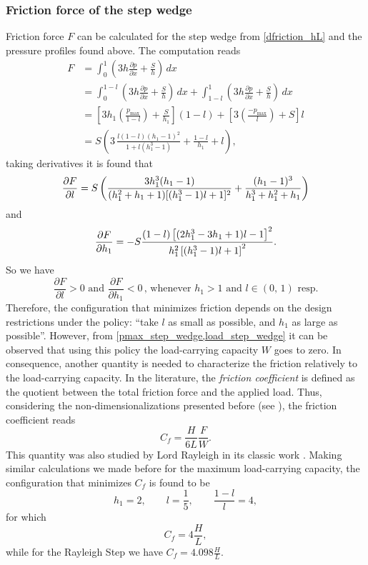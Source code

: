 \subsubsection*{Friction force of the step wedge}
\label{sec:friction_step_wedge}
Friction force $F$ can be calculated for the step wedge from \eqref{dfriction_hL} and the pressure profiles found above. The computation reads
\begin{align}
F&=\int_0^1 \left(3h\frac{\partial p}{\partial x} +\frac{S}{h}\right)\,dx\nonumber\\
&=\int_0^{1-l} \left(3h\frac{\partial p}{\partial x} +\frac{S}{h}\right)\,dx+\int_{1-l}^1 \left(3h\frac{\partial p}{\partial x} +\frac{S}{h}\right)\,dx\nonumber\\
&=\left[3h_1\left(\frac{p_\text{max}}{1-l}\right)+\frac{S}{h_1}\right](1-l)+\left[3\left(\frac{-p_\text{max}}{l}\right)+S\right] l\nonumber\\
&=S\left(3\,\frac{l(1-l)(h_1-1)^2}{1+l(h_1^3-1)}+\frac{1-l}{h_1}+l\right),\label{eq:friction_step_wedge}
\end{align}
taking derivatives it is found that
$$\frac{\partial F}{\partial l}=S\left(\frac{3h_1^3(h_1-1)}{(h_1^2+h_1+1)[(h_1^3-1)l+1]^2}+\frac{(h_1-1)^3}{h_1^3+h_1^2+h_1}\right)$$ and
$$\frac{\partial F}{\partial h_1}=-S\frac{(1-l)\left[(2h_1^3-3h_1+1)l-1\right]^2}{h_1^2\left[(h_1^3-1)l+1\right]^2}.$$
So we have
 $$\frac{\partial F}{\partial l}>0\text{ and }\frac{\partial F}{\partial h_1}<0\,\text{, whenever } h_1>1\text{ and }l\in (0,\,1)\text{ resp}.$$
Therefore, the configuration that minimizes friction depends on the design restrictions under the policy: ``take $l$ as small as possible, and $h_1$ as large as possible''. However, from \eqref{pmax_step_wedge,load_step_wedge} it can be observed that using this policy the load-carrying capacity $W$ goes to zero. In consequence, another quantity is needed to characterize the friction relatively to the load-carrying capacity. In the literature, the \emph{friction coefficient} is defined as the quotient between the total friction force and the applied load. Thus, considering the non-dimensionalizations presented before (see ), the friction coefficient reads 
\begin{equation}
C_f=\frac{H}{6L}\frac{F}{W}.\label{eq:friction_coefficient}
\end{equation}
This quantity was also studied by Lord Rayleigh in its classic work \cite{rayleigh1918}. Making similar calculations we made before for the maximum load-carrying capacity, the configuration that minimizes $C_f$ is found to be
\begin{equation*}
h_1=2,\qquad l=\frac{1}{5}, \qquad \frac{1-l}{l}=4,
\end{equation*}
for which $$C_f=4\frac{H}{L},$$
while for the Rayleigh Step we have $C_f=4.098\frac{H}{L}$.

